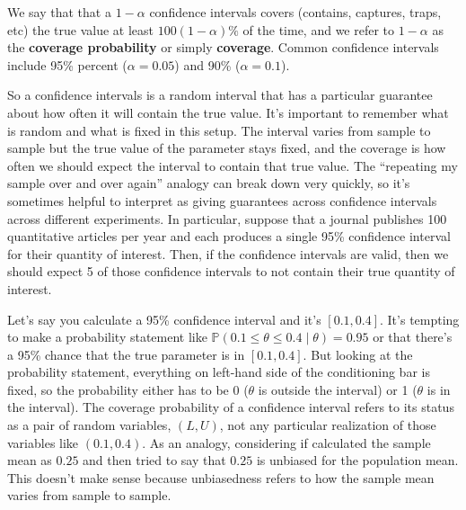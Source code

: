 \documentclass[
  letterpaper,
  DIV=11,
  numbers=noendperiod]{scrreprt}
\renewcommand{\P}{\mathbb{P}}
\theoremstyle{definition}
\theoremstyle{plain}
\theoremstyle{definition}
\theoremstyle{remark}
\begin{document}
We say that that a \(1-\alpha\) confidence intervals covers (contains,
captures, traps, etc) the true value at least \(100(1-\alpha)\%\) of the
time, and we refer to \(1-\alpha\) as the \textbf{coverage probability}
or simply \textbf{coverage}. Common confidence intervals include 95\%
percent (\(\alpha = 0.05\)) and 90\% (\(\alpha = 0.1\)).

So a confidence intervals is a random interval that has a particular
guarantee about how often it will contain the true value. It's important
to remember what is random and what is fixed in this setup. The interval
varies from sample to sample but the true value of the parameter stays
fixed, and the coverage is how often we should expect the interval to
contain that true value. The ``repeating my sample over and over again''
analogy can break down very quickly, so it's sometimes helpful to
interpret as giving guarantees across confidence intervals across
different experiments. In particular, suppose that a journal publishes
100 quantitative articles per year and each produces a single 95\%
confidence interval for their quantity of interest. Then, if the
confidence intervals are valid, then we should expect 5 of those
confidence intervals to not contain their true quantity of interest.

\begin{tcolorbox}[enhanced jigsaw, title=\textcolor{quarto-callout-warning-color}{\faExclamationTriangle}\hspace{0.5em}{Warning}, breakable, titlerule=0mm, opacityback=0, rightrule=.15mm, bottomrule=.15mm, colframe=quarto-callout-warning-color-frame, coltitle=black, colbacktitle=quarto-callout-warning-color!10!white, bottomtitle=1mm, toptitle=1mm, colback=white, arc=.35mm, opacitybacktitle=0.6, toprule=.15mm, leftrule=.75mm, left=2mm]

Let's say you calculate a 95\% confidence interval and it's
\([0.1, 0.4]\). It's tempting to make a probability statement like
\(\P(0.1 \leq \theta \leq 0.4 \mid \theta) = 0.95\) or that there's a
95\% chance that the true parameter is in \([0.1, 0.4]\). But looking at
the probability statement, everything on left-hand side of the
conditioning bar is fixed, so the probability either has to be 0
(\(\theta\) is outside the interval) or 1 (\(\theta\) is in the
interval). The coverage probability of a confidence interval refers to
its status as a pair of random variables, \((L, U)\), not any particular
realization of those variables like \((0.1, 0.4)\). As an analogy,
considering if calculated the sample mean as \(0.25\) and then tried to
say that \(0.25\) is unbiased for the population mean. This doesn't make
sense because unbiasedness refers to how the sample mean varies from
sample to sample.

\end{tcolorbox}
\end{document}
